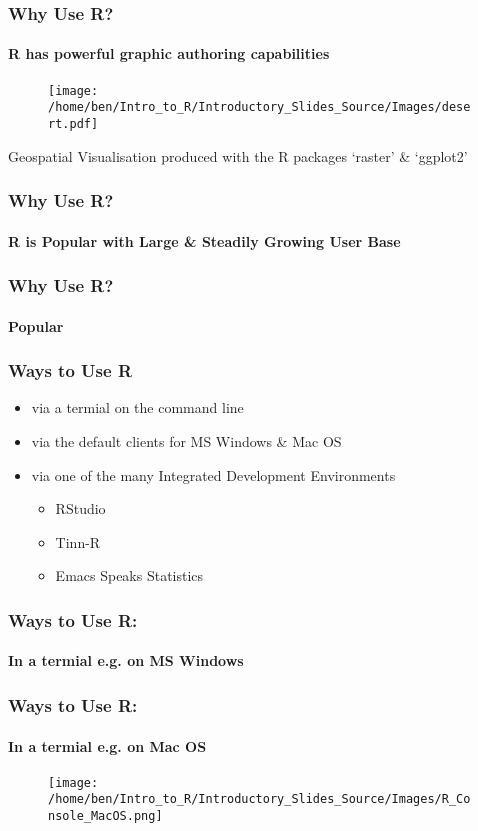 \documentclass[xcolor=dvipsnames]{beamer}
\begin{document}
\begin{frame} 
\frametitle{Why Use R?}
\framesubtitle{R has powerful graphic authoring capabilities}

\begin{figure}
\texttt{[image: /home/ben/Intro\_to\_R/Introductory\_Slides\_Source/Images/desert.pdf]}
\end{figure}

\tiny Geospatial Visualisation produced with the R packages `raster' \& `ggplot2'

\end{frame}




\begin{frame} 
\frametitle{Why Use R?}
\framesubtitle{R is Popular with Large \& Steadily Growing User Base}


\end{frame}


\begin{frame} 
\frametitle{Why Use R?}
\framesubtitle{Popular}
\end{frame}



\begin{frame} 
\frametitle{Ways to Use R}
\begin{itemize}
\item via a termial on the command line
\item via the default clients for MS Windows \& Mac OS
\item via one of the many Integrated Development Environments \begin{itemize}
 \item RStudio
 \item Tinn-R
 \item Emacs Speaks Statistics \end{itemize}
\end{itemize}
\end{frame}

\begin{frame}
\frametitle{Ways to Use R:}
\framesubtitle{In a termial e.g. on MS Windows}
\end{frame}

\begin{frame}
\frametitle{Ways to Use R:}
\framesubtitle{In a termial e.g. on Mac OS}
\begin{figure}
\texttt{[image: /home/ben/Intro\_to\_R/Introductory\_Slides\_Source/Images/R\_Console\_MacOS.png]}
\end{figure}
\end{frame}
\end{document}
